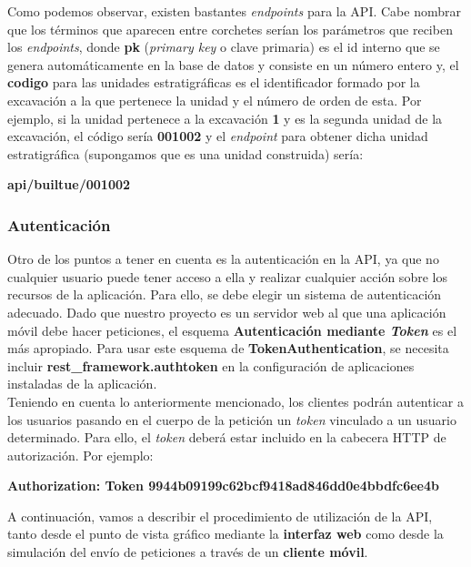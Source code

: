 Como podemos observar, existen bastantes \textit{endpoints} para la API. Cabe nombrar que
los términos que aparecen entre corchetes serían los parámetros que reciben los
\textit{endpoints}, donde \textbf{pk} (\textit{primary key} o clave primaria) es el id
interno que se genera automáticamente en la base de datos y consiste en un número entero y,
el \textbf{codigo} para las unidades estratigráficas es el identificador formado por la
excavación a la que pertenece la unidad y el número de orden de esta. Por ejemplo, si
la unidad pertenece a la excavación \textbf{1} y es la segunda unidad de la excavación, el
código sería \textbf{001002} y el \textit{endpoint} para obtener dicha unidad estratigráfica
(supongamos que es una unidad construida) sería:

            \begin{center} \textbf{api/builtue/001002} \end{center}

\subsubsection{Autenticación}
Otro de los puntos a tener en cuenta es la autenticación en la API, ya que no cualquier
usuario puede tener acceso a ella y realizar cualquier acción sobre los recursos de la
aplicación. Para ello, se debe elegir un sistema de autenticación adecuado. Dado que
nuestro proyecto es un servidor web al que una aplicación móvil debe hacer peticiones,
el esquema \textbf{Autenticación mediante \textit{Token}} es el más apropiado. Para usar
este esquema de \textbf{TokenAuthentication}, se necesita incluir
\textbf{rest\_framework.authtoken} en la configuración de aplicaciones instaladas de la
aplicación.\\

Teniendo en cuenta lo anteriormente mencionado, los clientes podrán autenticar a los usuarios
pasando en el cuerpo de la petición un \textit{token} vinculado a un usuario determinado.
Para ello, el \textit{token} deberá estar incluido en la cabecera HTTP de autorización. Por
ejemplo:

\begin{center}
    \textbf{Authorization: Token 9944b09199c62bcf9418ad846dd0e4bbdfc6ee4b}
\end{center}

A continuación, vamos a describir el procedimiento de utilización de la API, tanto desde el
punto de vista gráfico mediante la \textbf{interfaz web} como desde la simulación del envío
de peticiones a través de un \textbf{cliente móvil}.\\

